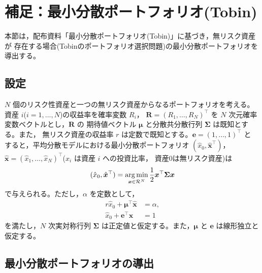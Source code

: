 \section{補足：最小分散ポートフォリオ(Tobin)}

本節は，配布資料「最小分散ポートフォリオ(Tobin)」に基づき，無リスク資産が
存在する場合(Tobinのポートフォリオ選択問題)の最小分散ポートフォリオを導出する。

\subsection{設定}

$N$ 個のリスク性資産と一つの無リスク資産からなるポートフォリオを考える。資産
$i$($i=1,\dots,N$)の収益率を確率変数 $R_i$，
$\bm{R} = (R_1,\dots,R_N)^\top$ を $N$ 次元確率変数ベクトルとし，$\bm{R}$ の
期待値ベクトル $\bm{\mu}$ と分散共分散行列 $\bm{\Sigma}$ は既知とする。また，
無リスク資産の収益率 $r$ は定数で既知とする。$\bm{e} = (1,\dots,1)^\top$ と
すると，平均分散モデルにおける最小分散ポートフォリオ
$(\hat x_0, \hat{\bm{x}}^\top)$，
$\hat{\bm{x}} = (\hat x_1,\dots,\hat x_N)^\top$($x_i$ は資産 $i$ への投資比率，
資産0は無リスク資産)は
\begin{equation}
(\hat x_0, \hat{\bm{x}}^\top) = \operatorname*{arg\,min}_{\bm{x}\in\mathcal{R}^N}
\frac{1}{2}\bm{x}^\top\bm{\Sigma}\bm{x}
\end{equation}
で与えられる。ただし，$\alpha$ を定数として，
\begin{align}
r\hat x_0 + \bm{\mu}^\top\hat{\bm{x}} &= \alpha,\\
\hat x_0 + \bm{e}^\top\hat{\bm{x}} &= 1
\end{align}
を満たし，$N$ 次実対称行列 $\bm{\Sigma}$ は正定値と仮定する。また，$\bm{\mu}$ と
$\bm{e}$ は線形独立と仮定する。

\subsection{最小分散ポートフォリオの導出}

